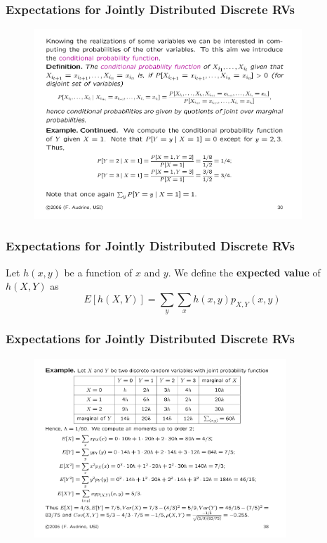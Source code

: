 \documentclass[notes=show,handout]{beamer}\usepackage[]{graphicx}\usepackage[]{color}
\begin{document}
\begin{frame}
\frametitle{Expectations for Jointly Distributed Discrete RVs}
\begin{example}
\begin{figure}[ptb]\centering
\includegraphics[width=0.9\textwidth,height=0.45\textheight]{img/ex_audrins_2.pdf}
\end{figure}
\end{example}
\end{frame}


\begin{frame}%

\frametitle{Expectations for Jointly Distributed Discrete RVs}

\begin{definition}
Let $h(x,y)$ be a function of $x$ and $y$.
We define the \textbf{expected value} of $h\left( X,Y\right) $ as%
\begin{equation*}
E\left[ h\left( X,Y\right) \right] =\sum_{y}\sum_{x}h\left( x,y\right)
p_{X,Y}\left( x,y\right)
\end{equation*}
\end{definition}
\end{frame}%




\begin{frame}
\frametitle{Expectations for Jointly Distributed Discrete RVs}
\begin{example}
\begin{figure}[ptb]\centering
\includegraphics[width=0.85\textwidth,height=0.78\textheight]{img/ex_tot.pdf}
\end{figure}
\end{example}
\end{frame}
\end{document}
